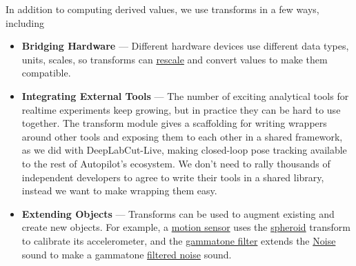 In addition to computing derived values, we use transforms in a few ways, including

\begin{itemize}
\item \textbf{Bridging Hardware} --- Different hardware devices use different data types, units, scales, so transforms can \href{https://docs.auto-pi-lot.com/en/latest/transform/units.html\#autopilot.transform.units.Rescale}{rescale} and convert values to make them compatible.
\item \textbf{Integrating External Tools} --- The number of exciting analytical tools for realtime experiments keep growing, but in practice they can be hard to use together. The transform module gives a scaffolding for writing wrappers around other tools and exposing them to each other in a shared framework, as we did with DeepLabCut-Live\citep{kaneRealtimeLowlatencyClosedloop2020a}, making closed-loop pose tracking available to the rest of Autopilot's ecosystem. We don't need to rally thousands of independent developers to agree to write their tools in a shared library, instead we want to make wrapping them easy.
\item \textbf{Extending Objects} --- Transforms can be used to augment existing and create new objects. For example, a \href{https://docs.auto-pi-lot.com/en/latest/hardware/i2c.html#autopilot.hardware.i2c.I2C_9DOF}{motion sensor} uses the \href{https://docs.auto-pi-lot.com/en/latest/transform/geometry.html\#autopilot.transform.geometry.Spheroid}{spheroid} transform to calibrate its accelerometer, and the \href{https://docs.auto-pi-lot.com/en/latest/transform/timeseries.html\#autopilot.transform.timeseries.Gammatone}{gammatone filter} extends the \href{https://docs.auto-pi-lot.com/en/latest/stim/sound/sounds.html\#autopilot.stim.sound.sounds.Noise}{Noise} sound to make a gammatone \href{https://docs.auto-pi-lot.com/en/latest/stim/sound/sounds.html\#autopilot.stim.sound.sounds.Gammatone}{filtered noise} sound.
\end{itemize}

